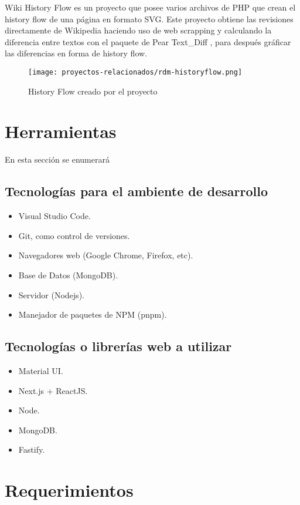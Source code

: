 Wiki History Flow es un proyecto que posee varios archivos de PHP que crean el history flow de una página en formato SVG. Este proyecto obtiene las revisiones directamente de Wikipedia haciendo uso de web scrapping y calculando la diferencia entre textos con el paquete de Pear Text\_Diff \cite{pear_text_diff}, para después gráficar las diferencias en forma de history flow.

\begin{figure}[H]
    \centering
    \texttt{[image: proyectos-relacionados/rdm-historyflow.png]}
    \caption{History Flow creado por el proyecto}
    \label{fig:rdm-historyflow}
\end{figure}


\section{Herramientas}
En esta sección se enumerará 

\subsection{Tecnologías para el ambiente de desarrollo}
\begin{itemize}
    \item Visual Studio Code.
    \item Git, como control de versiones.
    \item Navegadores web (Google Chrome, Firefox, etc).
    \item Base de Datos (MongoDB).
    \item Servidor (Nodejs).
    \item Manejador de paquetes de NPM (pnpm).
\end{itemize}

\subsection{Tecnologías o librerías web a utilizar}
\begin{itemize}
    \item Material UI.
    \item Next.js + ReactJS.
    \item Node.
    \item MongoDB.
    \item Fastify.
\end{itemize}

\section{Requerimientos}

